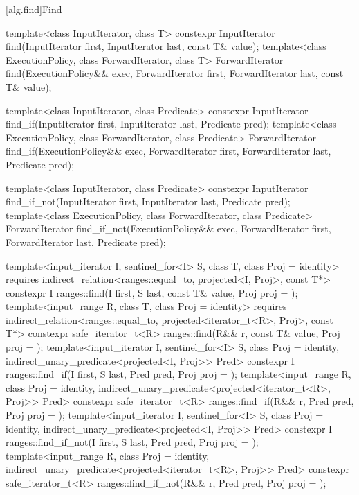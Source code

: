 [alg.find]{Find}

%
%
%
\begin{itemdecl}
template<class InputIterator, class T>
  constexpr InputIterator find(InputIterator first, InputIterator last,
                               const T& value);
template<class ExecutionPolicy, class ForwardIterator, class T>
  ForwardIterator find(ExecutionPolicy&& exec, ForwardIterator first, ForwardIterator last,
                       const T& value);

template<class InputIterator, class Predicate>
  constexpr InputIterator find_if(InputIterator first, InputIterator last,
                                  Predicate pred);
template<class ExecutionPolicy, class ForwardIterator, class Predicate>
  ForwardIterator find_if(ExecutionPolicy&& exec, ForwardIterator first, ForwardIterator last,
                          Predicate pred);

template<class InputIterator, class Predicate>
  constexpr InputIterator find_if_not(InputIterator first, InputIterator last,
                                      Predicate pred);
template<class ExecutionPolicy, class ForwardIterator, class Predicate>
  ForwardIterator find_if_not(ExecutionPolicy&& exec,
                              ForwardIterator first, ForwardIterator last,
                              Predicate pred);

template<input_iterator I, sentinel_for<I> S, class T, class Proj = identity>
  requires indirect_relation<ranges::equal_to, projected<I, Proj>, const T*>
  constexpr I ranges::find(I first, S last, const T& value, Proj proj = {});
template<input_range R, class T, class Proj = identity>
  requires indirect_relation<ranges::equal_to, projected<iterator_t<R>, Proj>, const T*>
  constexpr safe_iterator_t<R>
    ranges::find(R&& r, const T& value, Proj proj = {});
template<input_iterator I, sentinel_for<I> S, class Proj = identity,
         indirect_unary_predicate<projected<I, Proj>> Pred>
  constexpr I ranges::find_if(I first, S last, Pred pred, Proj proj = {});
template<input_range R, class Proj = identity,
         indirect_unary_predicate<projected<iterator_t<R>, Proj>> Pred>
  constexpr safe_iterator_t<R>
    ranges::find_if(R&& r, Pred pred, Proj proj = {});
template<input_iterator I, sentinel_for<I> S, class Proj = identity,
         indirect_unary_predicate<projected<I, Proj>> Pred>
  constexpr I ranges::find_if_not(I first, S last, Pred pred, Proj proj = {});
template<input_range R, class Proj = identity,
         indirect_unary_predicate<projected<iterator_t<R>, Proj>> Pred>
  constexpr safe_iterator_t<R>
    ranges::find_if_not(R&& r, Pred pred, Proj proj = {});
\end{itemdecl}


